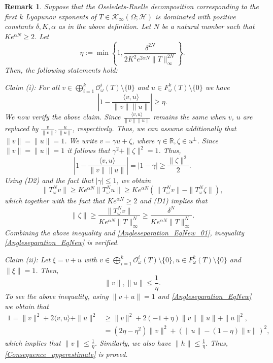 \documentclass[pdflatex,sn-mathphys-num]{sn-jnl}%
\theoremstyle{thmstyleone}%
\theoremstyle{thmstyletwo}%
\newtheorem{remark}{Remark}
\theoremstyle{thmstylethree}%
\newcommand{\R}{\mathbb{R}}
\numberwithin{equation}{section}
\begin{document}
\begin{remark}\label{Angleseparation_Remark} 
Suppose that the Oseledets-Ruelle decomposition corresponding to the first $k$ Lyapunov exponents of $T\in  \mathcal K_{\infty}(\Omega;\mathcal H)$ is dominated with positive constants $\delta,K,\alpha$ as in the above definition. Let $N$ be a natural number such that $Ke^{\alpha N}\geq 2$. Let
\begin{equation}\label{Constanteta}
\eta:=
\min
\left\{1, \frac{\delta^{2N}}{2 K^2e^{2\alpha N} \|T\|_{\infty}^{2N}}\right\}.
\end{equation}
Then, the following statements hold:

\noindent 
\emph{Claim (i)}: For all  $v\in \bigoplus_{i=1}^{k} \mathcal O^i_{\omega}(T)\setminus\{0\}$ and $u\in F^{k}_{\omega}(T)\setminus\{0\}$ we have 
\begin{equation}\label{Angleseparation_EqNew}
\left|1- \frac{\langle v, u \rangle}{\|v\|\|u\|}\right|
\geq  
\eta.
\end{equation}
We now verify the above claim. Since $\frac{\langle v, u \rangle}{\|v\|\|u\|}$ remains the same when $v$, $u$ are replaced by $\frac{v}{\|v\|}, \frac{u}{\|u\|}$, respectively.  Thus, we can assume additionally that $\|v\|=\|u\|=1$. We write $v=\gamma u+\zeta$, where $\gamma\in \R, \zeta\in u^{\perp}$. Since $\|v\|=\|u\|=1$ it follows that $\gamma^2+\|\zeta\|^2=1$. Thus, 
\begin{equation}\label{Angleseparation_EqNew_01}
\left|1- \frac{\langle v, u \rangle}{\|v\|\|u\|}\right|
=
|1-\gamma|
\geq \frac{\|\zeta\|^2}{2}.
\end{equation}
Using (D2) and the fact that $|\gamma|\leq 1$, we obtain 
\[
\|T^N_{\omega} v\| \geq K e^{\alpha N} \|T^N_{\omega}u\|
\geq K e^{\alpha N} \left(\|T^N_{\omega} v\|-\|T^N_{\omega} \zeta\|\right),
\]
which together with the fact that $Ke^{\alpha N}\geq 2$ and (D1) implies that 
\[
\|\zeta\|
\geq \frac{\|T^N_{\omega}v\|}{Ke^{\alpha N} \|T\|_{\infty}^N}
\geq \frac{\delta^N}{Ke^{\alpha N} \|T\|_{\infty}^N}.
\]
Combining the above inequality and \eqref{Angleseparation_EqNew_01}, inequality \eqref{Angleseparation_EqNew} is verified.  

\noindent
\emph{Claim (ii)}: Let $\xi=v+u$ with $v\in \bigoplus_{i=1}^{k} \mathcal O^i_{\omega}(T)\setminus\{0\}, u\in F^{k}_{\omega}(T)\setminus\{0\}$ and $\|\xi\|=1$. Then, 
\begin{equation}\label{Consequence_upperestimate}
\|v\|,\|u\|\leq \frac{1}{\eta}.    
\end{equation}
To see the above inequality, using $\|v+u\|=1$ and \eqref{Angleseparation_EqNew} we obtain that 
\begin{align*}
1=\|v\|^2+2 \langle v, u \rangle +\|u\|^2
& \geq  
\|v\|^2+2 (-1+\eta)\|v\|\|u\|  +\|u\|^2,\\[1ex]
& = (2\eta-\eta^2) \|v\|^2+ (\|u\|-(1-\eta)\|v\|)^2,
\end{align*}
which implies that $\|v\| \leq \frac{1}{\eta}$. Similarly, we also have $\|h\| \leq \frac{1}{\eta}$. Thus, \eqref{Consequence_upperestimate} is proved.
\end{remark}
\end{document}
